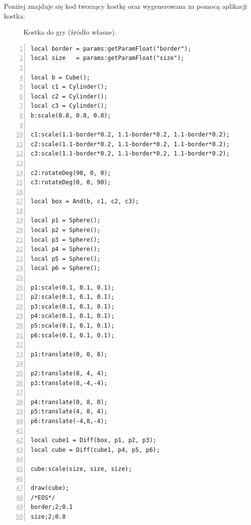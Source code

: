 Poniżej znajduje się kod tworzący kostkę oraz wygenerowana za pomocą aplikacji
kostka:
\begin{figure}[h!]
  \centering
  \qquad
  \caption{Kostka do gry (źródło własne).}
\end{figure}
{
\small
\begin{lstlisting}[numbers=left,frame=single,numberstyle=\tiny,backgroundcolor=\color{code_back},breaklines=true]
local border = params:getParamFloat("border");
local size   = params:getParamFloat("size");

local b = Cube();
local c1 = Cylinder();
local c2 = Cylinder();
local c3 = Cylinder();
b:scale(0.8, 0.8, 0.8);

c1:scale(1.1-border*0.2, 1.1-border*0.2, 1.1-border*0.2);
c2:scale(1.1-border*0.2, 1.1-border*0.2, 1.1-border*0.2);
c3:scale(1.1-border*0.2, 1.1-border*0.2, 1.1-border*0.2);

c2:rotateDeg(90, 0, 0);
c3:rotateDeg(0, 0, 90);

local box = And(b, c1, c2, c3);

local p1 = Sphere();
local p2 = Sphere();
local p3 = Sphere();
local p4 = Sphere();
local p5 = Sphere();
local p6 = Sphere();

p1:scale(0.1, 0.1, 0.1);
p2:scale(0.1, 0.1, 0.1);
p3:scale(0.1, 0.1, 0.1);
p4:scale(0.1, 0.1, 0.1);
p5:scale(0.1, 0.1, 0.1);
p6:scale(0.1, 0.1, 0.1);

p1:translate(0, 0, 8);

p2:translate(8, 4, 4);
p3:translate(8,-4,-4);

p4:translate(0, 8, 0);
p5:translate(4, 8, 4);
p6:translate(-4,8,-4);

local cube1 = Diff(box, p1, p2, p3);
local cube = Diff(cube1, p4, p5, p6);

cube:scale(size, size, size);

draw(cube);
/*EOS*/
border;2;0.1
size;2;0.8
\end{lstlisting}
}

